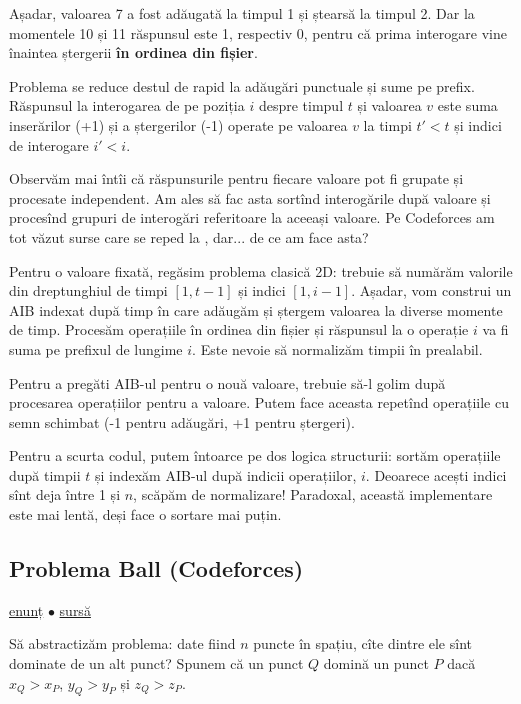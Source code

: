 \documentclass[../main.tex]{subfiles}
\begin{document}
Așadar, valoarea 7 a fost adăugată la timpul 1 și ștearsă la timpul 2. Dar la momentele 10 și 11 răspunsul este 1, respectiv 0, pentru că prima interogare vine înaintea ștergerii \textbf{în ordinea din fișier}.

Problema se reduce destul de rapid la adăugări punctuale și sume pe prefix. Răspunsul la interogarea de pe poziția $i$ despre timpul $t$ și valoarea $v$ este suma inserărilor (+1) și a ștergerilor (-1) operate pe valoarea $v$ la timpi $t' < t$ și indici de interogare $i' < i$.

Observăm mai întîi că răspunsurile pentru fiecare valoare pot fi grupate și procesate independent. Am ales să fac asta sortînd interogările după valoare și procesînd grupuri de interogări referitoare la aceeași valoare. Pe Codeforces am tot văzut surse care se reped la , dar... de ce am face asta?

Pentru o valoare fixată, regăsim problema clasică 2D: trebuie să numărăm valorile din dreptunghiul de timpi $[1, t - 1]$ și indici $[1, i - 1]$. Așadar, vom construi un AIB indexat după timp în care adăugăm și ștergem valoarea la diverse momente de timp. Procesăm operațiile în ordinea din fișier și răspunsul la o operație $i$ va fi suma pe prefixul de lungime $i$. Este nevoie să normalizăm timpii în prealabil.

Pentru a pregăti AIB-ul pentru o nouă valoare, trebuie să-l golim după procesarea operațiilor pentru a valoare. Putem face aceasta repetînd operațiile cu semn schimbat (-1 pentru adăugări, +1 pentru ștergeri).

Pentru a scurta codul, putem întoarce pe dos logica structurii: sortăm operațiile după timpii $t$ și indexăm AIB-ul după indicii operațiilor, $i$. Deoarece acești indici sînt deja între 1 și $n$, scăpăm de normalizare! Paradoxal, această implementare este mai lentă, deși face o sortare mai puțin. 

\subsection{Problema Ball (Codeforces)}
\label{problem:ball}

\href{https://codeforces.com/contest/12/problem/D}{enunț}
$\bullet$
\hyperref[code:ball]{sursă}

Să abstractizăm problema: date fiind $n$ puncte în spațiu, cîte dintre ele sînt dominate de un alt punct? Spunem că un punct $Q$ domină un punct $P$ dacă $x_Q > x_P$, $y_Q > y_P$ și $z_Q > z_P$.
\end{document}
